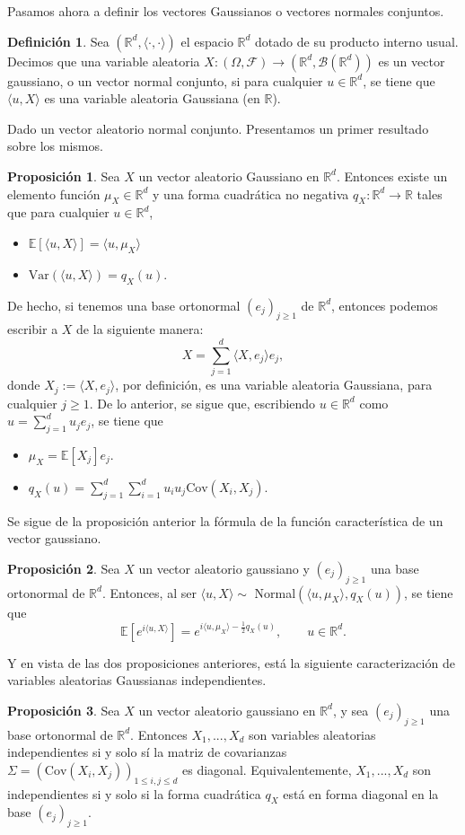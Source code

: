 \documentclass[letterpaper,twoside]{book}
\newcommand{\R}{\mathbb{R}}
\newcommand{\F}{\mathcal{F}}
\newcommand{\B}{\mathcal{B}}
\newcommand{\E}{\mathbb{E}}
\newcommand{\1}{\mathds{1}}
\renewcommand{\to}{\rightarrow}
\theoremstyle{definition}
\newtheorem{dfn}{Definición}
\theoremstyle{definition}
\theoremstyle{definition}
\theoremstyle{definition}
\newtheorem{prop}{Proposición}
\theoremstyle{definition}
\theoremstyle{definition}
\theoremstyle{definition}
\begin{document}
 Pasamos ahora a definir los vectores Gaussianos o vectores normales conjuntos. 
 \begin{dfn} 
  Sea $(\R^d, \langle\cdot,\cdot\rangle)$ el espacio $\R^{d}$ dotado de su producto interno usual. Decimos que una variable aleatoria $X:(\Omega,\F)\to (\R^{d},\B(\R^d))$ es un vector gaussiano, o un vector normal conjunto, si para cualquier $u\in \R^d$, se tiene que $\langle u,X\rangle$ es una variable aleatoria Gaussiana (en $\R$).
  \end{dfn}
Dado un vector aleatorio normal conjunto. Presentamos un primer resultado sobre los mismos.
\begin{prop} 
Sea $X$ un vector aleatorio Gaussiano en $\R^{d}$. Entonces existe un elemento función $\mu_X\in\R^d$ y una forma cuadrática no negativa $q_X:\R^d\to \R$ tales que para cualquier $u\in \R^d$,
\begin{itemize}
    \item $\E\left[\langle u,X\rangle\right]=\langle u,\mu_X\rangle$
    \item $\text{Var}\left(\langle u,X\rangle\right)=q_X(u)$.
\end{itemize}
De hecho, si tenemos una base ortonormal $(e_{j})_{j\geq1}$ de $\R^{d}$, entonces podemos escribir a $X$ de la siguiente manera:
\[
X=\sum_{j=1}^{d}\langle X,e_j\rangle e_j,  
\]
donde $X_j:=\langle X,e_j\rangle$, por definición, es una variable aleatoria Gaussiana, para cualquier $j\geq1$. De lo anterior, se sigue que, escribiendo $u\in \R^d$ como $u=\sum_{j=1}^{d}u_je_j$, se tiene que 
\begin{itemize}
    \item $\mu_X=\E\left[X_j\right]e_j$.
    \item $q_X(u)=\sum_{j=1}^{d}\sum_{i=1}^{d}u_iu_j \text{Cov}\left(X_i,X_j\right)$.
\end{itemize}
 \end{prop}

Se sigue de la proposición anterior la fórmula de la función característica de un vector gaussiano.
\begin{prop} 
 Sea $X$ un vector aleatorio gaussiano y $(e_j)_{j\geq1}$ una base ortonormal de $\R^{d}$. Entonces, al ser $\langle u,X\rangle\sim$ Normal$(\langle u,\mu_X\rangle,q_X(u))$, se tiene que %
 \[
 \E\left[e^{i\langle u,X\rangle}\right]=e^{i \langle u,\mu_X\rangle-\frac{1}{2}q_X(u)}, \qquad u\in \R^d.
 \]
 \end{prop}
Y en vista de las dos proposiciones anteriores, está la siguiente caracterización de variables aleatorias Gaussianas independientes.
\begin{prop} 
 Sea $X$ un vector aleatorio gaussiano en $\R^{d}$, y sea $(e_j)_{j\geq1}$ una base ortonormal de $\R^{d}$. Entonces $X_1,...,X_d$ son variables aleatorias independientes si y solo sí la matriz de covarianzas $\Sigma=(\text{Cov}\left(X_i,X_j\right))_{1\leq i,j\leq d}$ es diagonal. Equivalentemente, $X_1,...,X_d$ son independientes si y solo si la forma cuadrática $q_X$ está en forma diagonal en la base $(e_j)_{j\geq1}$.
 \end{prop}
\end{document}
